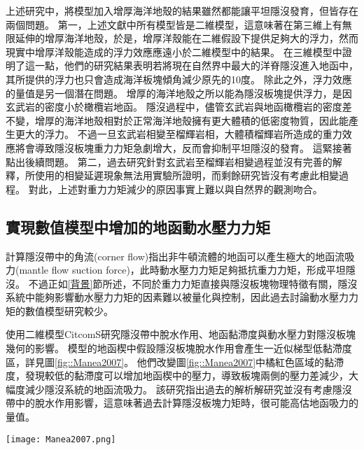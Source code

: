 上述研究中，將模型加入增厚海洋地殼的結果雖然都能讓平坦隱沒發育，但皆存在兩個問題。
第一，上述文獻中所有模型皆是二維模型，這意味著在第三維上有無限延伸的增厚海洋地殼，於是，增厚洋殼能在二維假設下提供足夠大的浮力，然而現實中增厚洋殼能造成的浮力效應應遠小於二維模型中的結果。
\citealp{florez2019impact}在三維模型中證明了這一點，他們的研究結果表明若將現在自然界中最大的洋脊隱沒進入地函中，其所提供的浮力也只會造成海洋板塊傾角減少原先的10度。
除此之外，浮力效應的量值是另一個潛在問題。
增厚的海洋地殼之所以能為隱沒板塊提供浮力，是因玄武岩的密度小於橄欖岩地函。
隱沒過程中，儘管玄武岩與地函橄欖岩的密度差不變，增厚的海洋地殼相對於正常海洋地殼擁有更大體積的低密度物質，因此能產生更大的浮力。
不過一旦玄武岩相變至榴輝岩相，大體積榴輝岩所造成的重力效應將會導致隱沒板塊重力力矩急劇增大，反而會抑制平坦隱沒的發育。
這緊接著點出後續問題。
第二，過去研究針對玄武岩至榴輝岩相變過程並沒有完善的解釋，\citealp{van2002role}所使用的相變延遲現象無法用實驗所證明，而剩餘研究皆沒有考慮此相變過程。
對此，上述對重力力矩減少的原因事實上難以與自然界的觀測吻合。


\subsection{實現數值模型中增加的地函動水壓力力矩}
\citealp{tovish1978mantle}計算隱沒帶中的角流(corner flow)指出非牛頓流體的地函可以產生極大的地函流吸力(mantle flow suction force)，此時動水壓力力矩足夠抵抗重力力矩，形成平坦隱沒。
不過正如\ref{背景}節所述，不同於重力力矩直接與隱沒板塊物理特徵有關，隱沒系統中能夠影響動水壓力力矩的因素難以被量化與控制，因此過去討論動水壓力力矩的數值模型研究較少。

\citealp{Manea2007}使用二維模型CitcomS研究隱沒帶中脫水作用、地函黏滯度與動水壓力對隱沒板塊幾何的影響。
模型的地函楔中假設隱沒板塊脫水作用會產生一近似梯型低黏滯度區，詳見圖\ref{fig::Manea2007}。
他們改變圖\ref{fig::Manea2007}中橘紅色區域的黏滯度，發現較低的黏滯度可以增加地函楔中的壓力，導致板塊兩側的壓力差減少，大幅度減少隱沒系統的地函流吸力。
該研究指出過去\citealp{tovish1978mantle}的解析解研究並沒有考慮隱沒帶中的脫水作用影響，這意味著過去計算隱沒板塊力矩時，很可能高估地函吸力的量值。

\begin{figure*}[ht!]
    \centering
    \texttt{[image: Manea2007.png]}
    \caption[\citealp{Manea2007}模型中所設定的低黏滯度近似梯形區與低黏滯度通道區域]{\citealp{Manea2007}模型中所設定的低黏滯度近似梯形區(LVW, low viscosity wedge)與低黏滯度通道(LVC, low viscosity channel)區域，表示隱沒帶的脫水作用對地函楔造成的影響。其中h$_min$、h$_max$、d$_lvc$皆為模型中可調整的參數，用以控制低黏滯度近似梯形區與低黏滯度通道的範圍與深度。}
    \label{fig::Manea2007}
\end{figure*}

